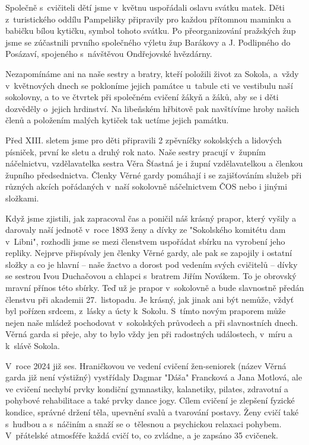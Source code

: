 \documentclass[a5paper, 11pt, twoside]{article}
\begin{document}
Společně s~cvičiteli dětí jsme v~květnu uspořádali oslavu svátku matek.
Děti z~turistického oddílu Pampelišky připravily pro každou přítomnou
maminku a babičku bílou kytičku, symbol tohoto svátku. Po
přeorganizování pražských žup jsme se zúčastnili prvního společného
výletu žup Barákovy a J. Podlipného do Posázaví, spojeného s~návštěvou
Ondřejovské hvězdárny.

Nezapomínáme ani na naše sestry a bratry, kteří položili život za
Sokola, a~vždy v~květnových dnech se pokloníme jejich památce u~tabule
cti ve vestibulu naší sokolovny, a to ve čtvrtek při společném cvičení
žákyň a žáků, aby se i děti dozvěděly o~jejich hrdinství. Na libeňském
hřbitově pak navštívíme hroby našich členů a položením malých kytiček
tak uctíme jejich památku.

Před XIII. sletem jsme pro děti připravili 2 zpěvníčky sokolských a
lidových písniček, první ke sletu a druhý rok nato. Naše sestry pracují
v~župním náčelnictvu, vzdělavatelka sestra Věra Šťastná je i župní
vzdělavatelkou a členkou župního předsednictva. Členky Věrné gardy
pomáhají i se zajišťováním služeb při různých akcích pořádaných v~naší
sokolovně náčelnictvem ČOS nebo i jinými složkami.

Když jsme zjistili, jak zapracoval čas a poničil náš krásný prapor,
který vyšily a darovaly naší jednotě v~roce 1893 ženy a dívky ze
"Sokolského komitétu dam v~Libni", rozhodli jsme se mezi členstvem
uspořádat sbírku na vyrobení jeho repliky. Nejprve přispívaly jen členky
Věrné gardy, ale pak se zapojily i ostatní složky a co je hlavní -- naše
žactvo a dorost pod vedením svých cvičitelů -- dívky se sestrou Ivou
Duchačovou a chlapci s~bratrem Jiřím Novákem. To je obrovský mravní
přínos této sbírky. Teď už je prapor v~sokolovně a bude slavnostně
předán členstvu při akademii 27.~listopadu. Je krásný, jak jinak ani být
nemůže, vždyť byl pořízen srdcem, z~lásky a úcty k~Sokolu. S~tímto novým
praporem může nejen naše mládež pochodovat v~sokolských průvodech a při
slavnostních dnech. Věrná garda si přeje, aby to bylo vždy jen při
radostných událostech, v~míru a k~slávě Sokola.

V~roce 2024 již ses. Hraničkovou ve vedení cvičení žen-seniorek (název
Věrná garda již není výstižný) vystřídaly Dagmar "Dáša" Francková a
Jana Motlová, ale ve cvičení nechybí prvky kondiční gymnastiky,
kalanetiky, pilates, zdravotní a pohybové rehabilitace a také prvky
dance jogy. Cílem cvičení je zlepšení fyzické kondice, správné držení
těla, upevnění svalů a tvarování postavy. Ženy cvičí také s~hudbou a
s~náčiním a snaží se o~tělesnou a psychickou relaxaci pohybem. V~přátelské
atmosféře každá cvičí to, co zvládne, a je zapsáno 35 cvičenek.
\end{document}
